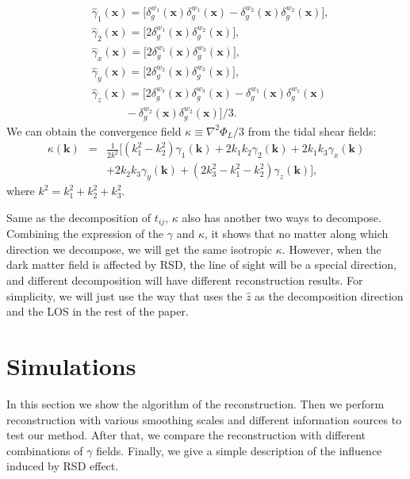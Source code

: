 \documentclass[aps,prd,twocolumn,showpacs,superscriptaddress,groupedaddress,nofootinbib]{revtex4}  %
\begin{document}
\begin{equation}
\begin{split}
&\hat{\gamma}_1(\bm{x})=\big[{\delta}^{w_1}_g(\bm{x}){\delta}^{w_1}_g(\bm{x})-
{\delta}^{w_2}_g(\bm{x}){\delta}^{w_2}_g(\bm{x})\big],\\
&\hat{\gamma}_2(\bm{x})=\big[2{\delta}^{w_1}_g(\bm{x}){\delta}^{w_2}_g(\bm{x})\big],\\
&\hat{\gamma}_x(\bm{x})=\big[2{\delta}^{w_1}_g(\bm{x}){\delta}^{w_3}_g(\bm{x})\big],\\
&\hat{\gamma}_y(\bm{x})=\big[2{\delta}^{w_2}_g(\bm{x}){\delta}^{w_3}_g(\bm{x})\big],\\
&\hat{\gamma}_z(\bm{x})=\big[2{\delta}^{w_3}_g(\bm{x}){\delta}^{w_3}_g(\bm{x})-
{\delta}^{w_1}_g(\bm{x}){\delta}^{w_1}_g(\bm{x}) \\
&\quad\quad\quad-{\delta}^{w_2}_g(\bm{x}){\delta}^{w_2}_g(\bm{x})\big]/3.
\end{split}
\label{eq13}
\end{equation}
We can obtain the convergence field $\kappa \equiv \nabla^2\Phi_L/3$ from the tidal shear fields:
\begin{eqnarray}
\kappa(\bm{k})&=&\frac{1}{2k^2}
[(k_1^2-k_2^2)\gamma_1(\bm{k})+2k_1k_2\gamma_2(\bm{k})+2k_1k_3\gamma_x(\bm{k})\nonumber\\
&&+2k_2k_3\gamma_y(\bm{k})+(2k_3^2-k_1^2-k_2^2)\gamma_z(\bm{k})],
\label{eq14}
\end{eqnarray}
where $k^2 = k_1^2+k_2^2+k_3^2$.

Same as the decomposition of $t_{ij}$, $\kappa$ also has another two ways to decompose. Combining the expression of the $\gamma$ and $\kappa$, it shows that no matter along which direction we decompose, we will get the same isotropic $\kappa$. However, when the dark matter field is affected by RSD, the line of sight will be a special direction, and different decomposition will have different reconstruction results.
For simplicity, we will just use the way that uses the ${\hat{z}}$ as the decomposition direction and the LOS in the rest of the paper.


\section{Simulations}\label{section:Simulations}
In this section we show the algorithm of the reconstruction. Then we perform reconstruction with various smoothing scales and different information sources to test our method. After that, we compare the reconstruction with different combinations of $\gamma$ fields. Finally, we give a simple description of the influence induced by RSD effect.
\end{document}
